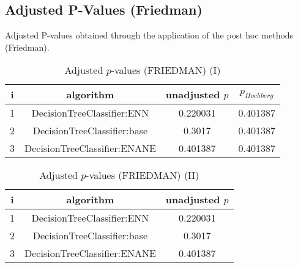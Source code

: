 \documentclass[a4paper,10pt]{article}
\begin{document}
\begin{landscape}
\section{Adjusted P-Values (Friedman)}


Adjusted P-values obtained through the application of the post hoc methods (Friedman).

\begin{table}[!htp]
\centering\small
\begin{tabular}{cccc}
i&algorithm&unadjusted $p$&$p_{Hochberg}$\\
\hline1&DecisionTreeClassifier:ENN&0.220031&0.401387\\2&DecisionTreeClassifier:base&0.3017&0.401387\\3&DecisionTreeClassifier:ENANE&0.401387&0.401387\\\hline
\end{tabular}
\caption{Adjusted $p$-values (FRIEDMAN) (I)}
\end{table}
\begin{table}[!htp]
\centering\small
\begin{tabular}{ccc}
i&algorithm&unadjusted $p$\\
\hline1&DecisionTreeClassifier:ENN&0.220031\\2&DecisionTreeClassifier:base&0.3017\\3&DecisionTreeClassifier:ENANE&0.401387\\\hline
\end{tabular}
\caption{Adjusted $p$-values (FRIEDMAN) (II)}
\end{table}

\newpage
\end{landscape}
\end{document}
